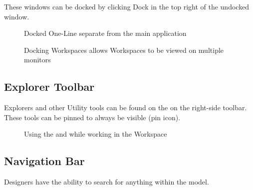 \documentclass[letterpaper,10pt,english]{sphinxmanual}
\begin{document}
These windows can be docked by clicking Dock in the top right of the undocked window.

\begin{figure}[H]
\centering
\capstart

\noindent{}
\caption{Docked One-Line separate from the main application}\label{\detokenize{docs/userguide/index-user_guide:id16}}\end{figure}

\begin{figure}[H]
\centering
\capstart

\noindent{}
\caption{Docking Workspaces allows Workspaces to be viewed on multiple monitors}\label{\detokenize{docs/userguide/index-user_guide:id17}}\end{figure}


\subsection{Explorer Toolbar}
\label{\detokenize{docs/userguide/index-user_guide:explorer-toolbar}}
Explorers and other Utility tools can be found on the {\hyperref[\detokenize{docs/userguide/index-user_guide:id10}]{}} on the right-side toolbar.  These tools can be pinned to always be visible (pin icon).

\begin{figure}[H]
\centering
\capstart

\noindent{}
\caption{Using the {\hyperref[\detokenize{docs/userguide/explorersandutilitytools/propertiesexplorer/index-properties_explorer:properties-explorer}]{}} and {\hyperref[\detokenize{docs/userguide/buildingelectricalmodel/flagtracker/index-flag_tracker:flag-tracker}]{}} while working in the {\hyperref[\detokenize{docs/userguide/buildingelectricalmodel/one-line/index-one-line:one-line}]{}} Workspace}\label{\detokenize{docs/userguide/index-user_guide:id18}}\end{figure}


\subsection{Navigation Bar}
\label{\detokenize{docs/userguide/index-user_guide:navigation-bar}}\label{\detokenize{docs/userguide/index-user_guide:id2}}
Designers have the ability to search for anything within the model.
\end{document}
